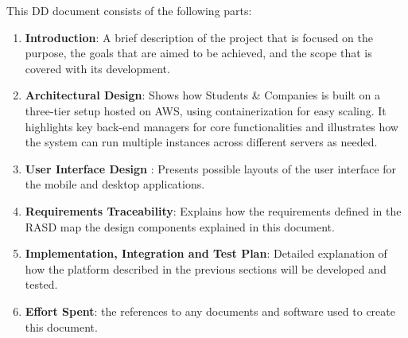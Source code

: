 \renewcommand{\arraystretch}{1.6}
This DD document consists of the following parts:
\begin{enumerate}
    \item \textbf{Introduction}: A brief description of the project that is focused on the purpose, the goals that are aimed to be achieved, and the scope that is covered with its development.
    \item \textbf{Architectural Design}: Shows how Students \& Companies is built on a three-tier setup hosted on AWS, using containerization for easy scaling. It highlights key back-end managers for core functionalities and illustrates how the system can run multiple instances across different servers as needed.
    \item \textbf{User Interface Design }: Presents possible layouts of the user interface for the mobile and
desktop applications.
    \item \textbf{Requirements Traceability}: Explains how the requirements defined in the RASD map the design components explained in this document.
    \item \textbf{ Implementation, Integration and Test Plan}: Detailed explanation of how the platform described in the previous sections will be developed and tested.
    \item \textbf{ Effort Spent}: the references to any documents and software used to create this document.
\end{enumerate}